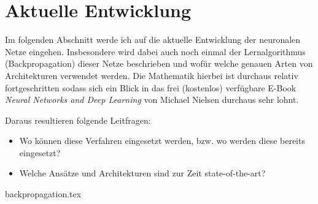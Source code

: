 \part{Aktuelle Entwicklung}

Im folgenden Abschnitt werde ich auf die aktuelle Entwicklung der neuronalen Netze eingehen. Insbesondere wird dabei auch noch einmal der Lernalgorithmus (Backpropagation) dieser Netze beschrieben und wofür welche genauen Arten von Architekturen verwendet werden. Die Mathematik hierbei ist durchaus relativ fortgeschritten sodass sich ein Blick in das frei (kostenlos) verfügbare E-Book \emph{Neural Networks and Deep Learning} von Michael Nielsen \cite{dlnielsen} durchaus sehr lohnt. 

Daraus resultieren folgende Leitfragen: 

\begin{itemize}
\item Wo können diese Verfahren eingesetzt werden, bzw. wo werden diese bereits eingesetzt?
\item Welche Ansätze und Architekturen sind zur Zeit state-of-the-art?
\end{itemize}

{backpropagation.tex}
\clearpage

